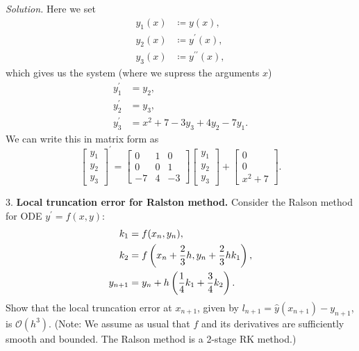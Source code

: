 \documentclass{article}
\newcommand{\Oh}{\mathcal{O}}
\begin{document}
\textit{Solution.}
Here we set
%
\begin{align*}
    y_1(x) &\coloneqq y(x), \\
    y_2(x) &\coloneqq y^\prime(x), \\
    y_3(x) &\coloneqq y^{\prime \prime} (x),
\end{align*}
%
which gives us the system (where we supress the arguments $x$)
%
\begin{align*}
    y_1^\prime &= y_2, \\
    y_2^\prime &= y_3, \\
    y_3^\prime &= x^2 + 7 - 3 y_3 + 4 y_2 - 7 y_1.
\end{align*}
%
We can write this in matrix form as
%
\begin{equation*}
    \begin{bmatrix}
        y_1 \\
        y_2 \\
        y_3
    \end{bmatrix}^\prime
    =
    \begin{bmatrix}
        0 & 1 & 0 \\
        0 & 0 & 1 \\
        -7 & 4 & -3
    \end{bmatrix}
    \begin{bmatrix}
        y_1 \\
        y_2 \\
        y_3
    \end{bmatrix}
    +
   \begin{bmatrix}
       0 \\
       0 \\
       x^2 + 7
   \end{bmatrix}
   .
\end{equation*}

\newpage

3. \textbf{Local truncation error for Ralston method.}
Consider the Ralson method for ODE $y^\prime = f(x, y)$:
%
\begin{align*}
    k_1 &= f(x_n, y_n), \\
    k_2 &= f\del{x_n + \frac{2}{3} h, y_n + \frac{2}{3}h k_1}, \\
    y_{n + 1} &= y_n + h \del{\frac{1}{4} k_1 + \frac{3}{4} k_2}.
\end{align*}
%
Show that the local truncation error at $x_{n + 1}$, given by
$l_{n + 1} = \hat{y}(x_{n + 1}) - y_{n + 1}$, is $\Oh(h^3)$.
(Note: We assume as usual that $f$ and its derivatives are sufficiently smooth and bounded. The Ralson method is a 2-stage RK method.)
\end{document}
